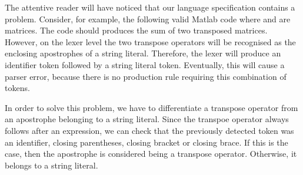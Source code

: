 The attentive reader will have noticed that our language specification contains a problem.
Consider, for example, the following valid Matlab code  where  and  are matrices.
The code should produces the sum of two transposed matrices.
However, on the lexer level the two transpose operators will be recognised as the enclosing apostrophes of a string literal.
Therefore, the lexer will produce an identifier token followed by a string literal token.
Eventually, this will cause a parser error, because there is no production rule requiring this combination of tokens.

In order to solve this problem, we have to differentiate a transpose operator from an apostrophe belonging to a string literal.
Since the transpoe operator always follows after an expression, we can check that the previously detected token was an identifier, closing parentheses, closing bracket or closing brace.
If this is the case, then the apostrophe is considered being a transpose operator.
Otherwise, it belongs to a string literal.